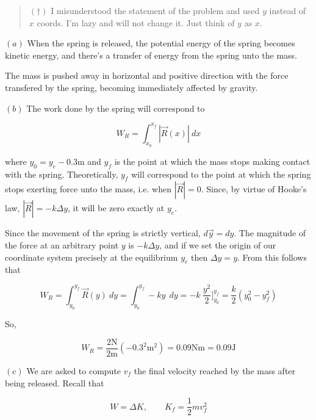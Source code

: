 \documentclass[12pt]{article}
\theoremstyle{definition}
\begin{document}
\small
\begin{quote}

$(\dagger)$ I misunderstood the statement of the problem and used $y$ instead of
$x$ coords. I'm lazy and will not change it. Just think of $y$ as $x$.

\end{quote}
\normalsize


$(a)$ When the spring is released, the potential energy of the spring becomes
kinetic energy, and there's a transfer of energy from the spring unto the mass.


The mass is pushed away in horizontal and positive direction with the force
transfered by the spring, becoming immediately affected by gravity.

$(b)$ The work done by the spring will correspond to 

\begin{equation*}
    W_R = \int_{x_0}^{x_f} |\vec{R}(x)| ~ dx
\end{equation*}

where $y_0 = y_e - 0.3\text{m}$ and $y_f$ is the point at which the mass stops
making contact with the spring. Theoretically, $y_f$ will correspond to the
point at which the spring stops exerting force unto the mass, i.e. when $\left|
\vec{R}\right| = 0$. Since, by virtue of Hooke's law, $\left| \vec{R} \right| =
-k\Delta y$, it will be zero exactly at $y_e$.

Since the movement of the spring is strictly vertical, $d\vec{y} = dy$. The
magnitude of the force at an arbitrary point $y$ is $-k\Delta y$,
and if we set the origin of our coordinate system precisely at the equilibrium
$y_e$ then $\Delta y = y $. From this follows that 

\begin{equation*}
    W_R = \int_{y_0}^{y_f} \vec{R}(y) ~ dy = \int_{y_0}^{y_f} -k y ~
    ~ dy 
        = -k ~ \frac{y^2}{2}\Big]_{y_0}^{y_f} =
    \frac{k}{2} (y_0^2 - y_f^2)
\end{equation*}

So, 

\begin{equation}
W_R = \frac{2\text{N}}{2\text{m}}\left( -0.3^2\text{m}^2 \right) = 0.09\text{Nm}
= 0.09\text{J}
\end{equation}

$(c)$ We are asked to compute $v_f$ the final velocity reached by the mass after
being released. Recall that 

\begin{equation*}
    W = \Delta K, \qquad K_f = \frac{1}{2}m v_f^2
\end{equation*}
\end{document}
